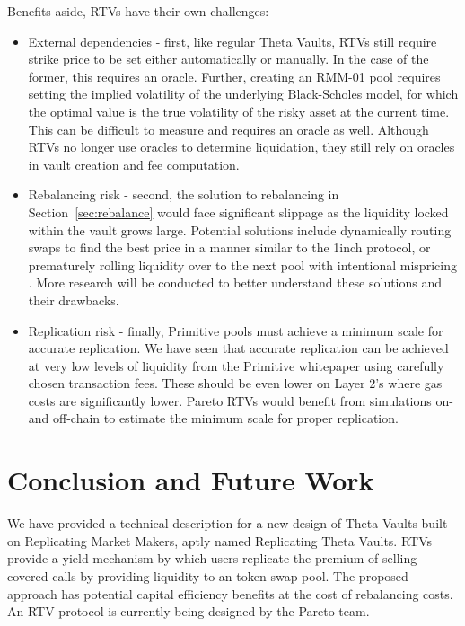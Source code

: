\documentclass[hidelinks, 12pt]{article}
\begin{document}
Benefits aside, RTVs have their own challenges:
\begin{itemize}
    \item External dependencies - first, like regular Theta Vaults, RTVs still require strike price to be set either automatically or manually. In the case of the former, this requires an oracle. Further, creating an RMM-01 pool requires setting the implied volatility of the underlying Black-Scholes model, for which the optimal value is the true volatility of the risky asset at the current time. This can be difficult to measure and requires an oracle as well. Although RTVs no longer use oracles to determine liquidation, they still rely on oracles in vault creation and fee computation.
    \item Rebalancing risk - second, the solution to rebalancing in Section~\ref{sec:rebalance} would face significant slippage as the liquidity locked within the vault grows large. Potential solutions include dynamically routing swaps to find the best price in a manner similar to the 1inch protocol, or prematurely rolling liquidity over to the next pool with intentional mispricing \cite{sterrett2022replicating}. More research will be conducted to better understand these solutions and their drawbacks.
    \item Replication risk - finally, Primitive pools must achieve a minimum scale for accurate replication. We have seen that accurate replication can be achieved at very low levels of liquidity from the Primitive whitepaper using carefully chosen transaction fees. These should be even lower on Layer 2's where gas costs are significantly lower. Pareto RTVs would benefit from simulations on- and off-chain to estimate the minimum scale for proper replication.
\end{itemize}

\section{Conclusion and Future Work}

We have provided a technical description for a new design of Theta Vaults built on Replicating Market Makers, aptly named Replicating Theta Vaults. RTVs provide a yield mechanism by which users replicate the premium of selling covered calls by providing liquidity to an token swap pool. The proposed approach has potential capital efficiency benefits at the cost of rebalancing costs.
An RTV protocol is currently being designed by the Pareto team.
\end{document}
